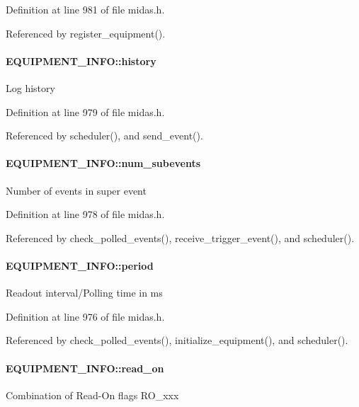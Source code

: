 Definition at line 981 of file midas.h.

Referenced by register\_\-equipment().
\paragraph[{history}]{ {\bf EQUIPMENT\_\-INFO::history}}\hfill\label{structEQUIPMENT__INFO_a2740dd481bbbb7c8e417b5818ff8e064}
Log history 

Definition at line 979 of file midas.h.

Referenced by scheduler(), and send\_\-event().
\paragraph[{num\_\-subevents}]{ {\bf EQUIPMENT\_\-INFO::num\_\-subevents}}\hfill\label{structEQUIPMENT__INFO_ade7b61b85a73ed33545caf31b706acd3}
Number of events in super event 

Definition at line 978 of file midas.h.

Referenced by check\_\-polled\_\-events(), receive\_\-trigger\_\-event(), and scheduler().
\paragraph[{period}]{ {\bf EQUIPMENT\_\-INFO::period}}\hfill\label{structEQUIPMENT__INFO_af7f674490636b6f9736fb680201001c2}
Readout interval/Polling time in ms 

Definition at line 976 of file midas.h.

Referenced by check\_\-polled\_\-events(), initialize\_\-equipment(), and scheduler().
\paragraph[{read\_\-on}]{ {\bf EQUIPMENT\_\-INFO::read\_\-on}}\hfill\label{structEQUIPMENT__INFO_a5079d6cb8b770782e0bce5046f476996}
Combination of Read-\/On flags RO\_\-xxx 

